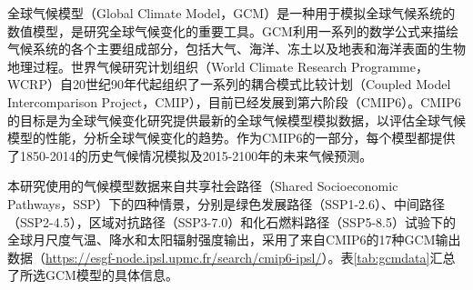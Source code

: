 全球气候模型（Global Climate Model，GCM）是一种用于模拟全球气候系统的数值模型，是研究全球气候变化的重要工具。GCM利用一系列的数学公式来描绘气候系统的各个主要组成部分，包括大气、海洋、冻土以及地表和海洋表面的生物地理过程。世界气候研究计划组织（World Climate Research Programme，WCRP）自20世纪90年代起组织了一系列的耦合模式比较计划（Coupled Model Intercomparison Project，CMIP），目前已经发展到第六阶段（CMIP6）。CMIP6的目标是为全球气候变化研究提供最新的全球气候模型模拟数据，以评估全球气候模型的性能，分析全球气候变化的趋势\cite{ZhouTianJunDiLiuCiGuoJiOuHeMoShiBiJiaoJiHuaCMIP6PingShu2019}。作为CMIP6的一部分，每个模型都提供了1850-2014的历史气候情况模拟及2015-2100年的未来气候预测\cite{ningWetterTrendSource2024}。\par
本研究使用的气候模型数据来自共享社会路径（Shared Socioeconomic Pathways，SSP）下的四种情景，分别是绿色发展路径（SSP1-2.6）、中间路径（SSP2-4.5），区域对抗路径（SSP3-7.0）和化石燃料路径（SSP5-8.5）试验下的全球月尺度气温、降水和太阳辐射强度输出，采用了来自CMIP6的17种GCM输出数据（\href{https://esgf-node.ipsl.upmc.fr/search/cmip6-ipsl/}{https://esgf-node.ipsl.upmc.fr/search/cmip6-ipsl/}）。表\ref{tab:gcmdata}汇总了所选GCM模型的具体信息。

